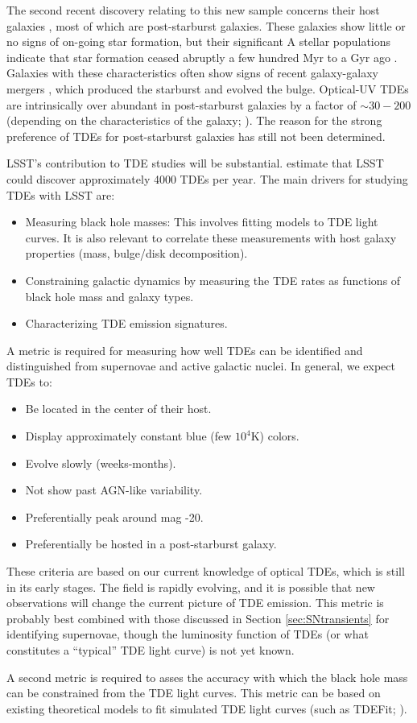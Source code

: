 The second recent discovery relating to this new sample concerns their
host galaxies \citep{Arcavi2014, French2016}, most of which are
post-starburst galaxies. These galaxies show little or no signs of on-going star formation, but their significant A stellar populations indicate that star formation ceased abruptly a few hundred Myr to a Gyr ago \citep{Dressler1983}. Galaxies with these characteristics often show signs of recent galaxy-galaxy mergers \citep{Zabludoff1996}, which produced the starburst and evolved the bulge. Optical-UV TDEs are intrinsically over abundant in post-starburst galaxies by a factor of $\sim30-200$ (depending on the characteristics of the galaxy; \citealt{French2016}). The reason for the strong preference of TDEs for post-starburst galaxies has still not been determined.

LSST's contribution to TDE studies will be substantial.
\citet{VanVelzen2011} estimate that LSST could discover approximately
4000 TDEs per year. The main drivers for studying TDEs with LSST are:
\begin{itemize}
\item Measuring black hole masses: This involves fitting models to TDE
light curves. It is also relevant to correlate these measurements with
host galaxy properties (mass, bulge/disk decomposition).
\item Constraining galactic dynamics by measuring the TDE rates as
functions of black hole mass and galaxy types.
\item Characterizing TDE emission signatures.
\end{itemize}

A metric is required for measuring how well TDEs can be identified and
distinguished from supernovae and active galactic nuclei. In general, we
expect TDEs to:
\begin{itemize}
\item Be located in the center of their host.
\item Display approximately constant blue (few $10^4$K) colors.
\item Evolve slowly (weeks-months).
\item Not show past AGN-like variability.
\item Preferentially peak around mag -20.
\item Preferentially be hosted in a post-starburst galaxy.
\end{itemize}
These criteria are based on our current knowledge of optical TDEs, which
is still in its early stages. The field is rapidly evolving, and it is
possible that new observations will change the current picture of TDE
emission. This metric is probably best combined with those discussed in
Section \ref{sec:SNtransients} for identifying supernovae, though the
luminosity function of TDEs (or what constitutes a ``typical'' TDE light
curve) is not yet known.

A second metric is required to asses the accuracy with which the black
hole mass can be constrained from the TDE light curves. This metric can
be based on existing theoretical models to fit simulated TDE light
curves (such as TDEFit; \citealt{Guillochon2014}).
